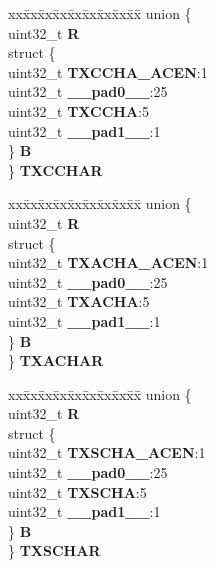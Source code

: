 \begin{DoxyCompactItemize}
\begin{tabbing}
\end{tabbing}\item 
\mbox{\label{structMLB__tag_a9854b3043fb7556979cc64d0106e85ec}} 
\begin{tabbing}
xx\=xx\=xx\=xx\=xx\=xx\=xx\=xx\=xx\=\kill
union \{\\
\>uint32\_t {\bfseries R}\\
\>struct \{\\
\>\>uint32\_t {\bfseries TXCCHA\_ACEN}:1\\
\>\>uint32\_t {\bfseries \_\_pad0\_\_}:25\\
\>\>uint32\_t {\bfseries TXCCHA}:5\\
\>\>uint32\_t {\bfseries \_\_pad1\_\_}:1\\
\>\} {\bfseries B}\\
\} {\bfseries TXCCHAR}\\

\end{tabbing}\item 
\mbox{\label{structMLB__tag_af8cf3ac06e296ee32e3b33cd7e7bd42c}} 
\begin{tabbing}
xx\=xx\=xx\=xx\=xx\=xx\=xx\=xx\=xx\=\kill
union \{\\
\>uint32\_t {\bfseries R}\\
\>struct \{\\
\>\>uint32\_t {\bfseries TXACHA\_ACEN}:1\\
\>\>uint32\_t {\bfseries \_\_pad0\_\_}:25\\
\>\>uint32\_t {\bfseries TXACHA}:5\\
\>\>uint32\_t {\bfseries \_\_pad1\_\_}:1\\
\>\} {\bfseries B}\\
\} {\bfseries TXACHAR}\\

\end{tabbing}\item 
\mbox{\label{structMLB__tag_ae2734dba07886aa27f4ffee7fd124ca4}} 
\begin{tabbing}
xx\=xx\=xx\=xx\=xx\=xx\=xx\=xx\=xx\=\kill
union \{\\
\>uint32\_t {\bfseries R}\\
\>struct \{\\
\>\>uint32\_t {\bfseries TXSCHA\_ACEN}:1\\
\>\>uint32\_t {\bfseries \_\_pad0\_\_}:25\\
\>\>uint32\_t {\bfseries TXSCHA}:5\\
\>\>uint32\_t {\bfseries \_\_pad1\_\_}:1\\
\>\} {\bfseries B}\\
\} {\bfseries TXSCHAR}\\


\end{tabbing}
\end{DoxyCompactItemize}
